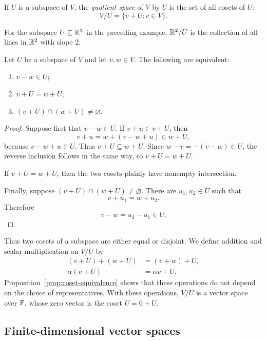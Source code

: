 \begin{definition}
  If $U$ is a subspace of $V$, the \emph{quotient space} of $V$ by $U$
  is the set of all cosets of $U$:
  \[
    V/U=\{v+U:v\in V\}.
  \]
\end{definition}

For the subspace $U\subseteq\mathbb{R}^2$ in the preceding example,
$\mathbb{R}^2/U$ is the collection of all lines in $\mathbb{R}^2$ with slope
$2$.

\begin{proposition}\label{prop:coset-equivalence}
  Let $U$ be a subspace of $V$ and let $v,w\in V$. The following are
  equivalent:
  \begin{enumerate}[label=(\roman*)]
    \item $v-w\in U$;
    \item $v+U=w+U$;
    \item $(v+U)\cap(w+U)\neq\varnothing$.
  \end{enumerate}
\end{proposition}

\begin{proof}
  Suppose first that $v-w\in U$. If $v+u\in v+U$, then
  \[
    v+u=w+(v-w+u)\in w+U,
  \]
  because $v-w+u\in U$. Thus $v+U\subseteq w+U$. Since
  $w-v=-(v-w)\in U$, the reverse inclusion follows in the same way, so
  $v+U=w+U$.

  If $v+U=w+U$, then the two cosets plainly have nonempty intersection.

  Finally, suppose $(v+U)\cap(w+U)\neq\varnothing$. There are
  $u_1,u_2\in U$ such that
  \[
    v+u_1=w+u_2.
  \]
  Therefore
  \[
    v-w=u_2-u_1\in U.
  \]
\end{proof}

Thus two cosets of a subspace are either equal or disjoint. We define
addition and scalar multiplication on $V/U$ by
\begin{align*}
  (v+U)+(w+U)&=(v+w)+U, \\
  \alpha(v+U)&=\alpha v+U.
\end{align*}
Proposition~\ref{prop:coset-equivalence} shows that these operations do
not depend on the choice of representatives. With these operations,
$V/U$ is a vector space over $\mathbb{F}$, whose zero vector is the coset
$U=0+U$.

\subsection{Finite-dimensional vector spaces}

